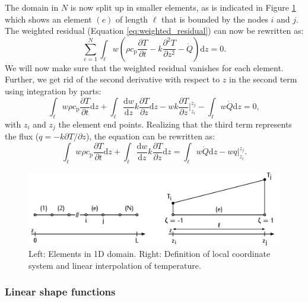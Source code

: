 \documentclass[10pt, a4paper, twoside, headinclude,footinclude, BCOR5mm]{scrartcl}
\begin{document}
The domain in \(N\) is now split up in smaller elements, as is indicated in Figure \ref{fig:org64cda58} which shows an element \((e)\) of length \(\ell\) that is bounded by the nodes \(i\) and \(j\). The weighted residual (Equation \ref{eq:weighted_residual}) can now be rewritten as:
\begin{equation}
  \sum_{e=1}^N
  \int_\ell w\left(
    \rho c_\text{p}\frac{\partial T}{\partial t} -
    k\frac{\partial^2 T}{\partial z^2} -
    \dot{Q} \right) \text{d}z = 0.
    \label{eq:weighted_residual_sum}
\end{equation}
We will now make sure that the weighted residual vanishes for each element. Further, we get rid of the second derivative with respect to \(z\) in the second term using integration by parts:
\begin{equation*}
  \int_\ell w \rho c_\text{p}\frac{\partial T}{\partial t} \text{d}z +
  \int_\ell
  \frac{\text{d}w}{\text{d}z}k\frac{\partial T}{\partial z}\text{d}z -
  wk\frac{\partial T}{\partial z}\Biggr|_{z_i}^{z_j} -
  \int_\ell w \dot{Q} \text{d}z = 0,
\end{equation*}
with \(z_i\) and \(z_j\) the element end points. Realizing that the third term represents the flux (\(q = -k \partial T / \partial z\)), the equation can be rewritten as:
\begin{equation}
  \int_\ell w \rho c_\text{p}\frac{\partial T}{\partial t} \text{d}z +
  \int_\ell
  \frac{\text{d}w}{\text{d}z}k\frac{\partial T}{\partial z}\text{d}z
  = \int_\ell w \dot{Q} \text{d}z -
  w q \Biggr|_{z_i}^{z_j}.
  \label{eq:weighted_residual_el}
\end{equation}

\begin{figure}[!tb]
\centering
\includegraphics[width=12cm]{./fig/lin_elements_sf.png}
\caption{\label{fig:org64cda58}Left: Elements in 1D domain. Right: Definition of local coordinate system and linear interpolation of temperature.}
\end{figure}

\subsubsection{Linear shape functions}
\label{sec:orgb88bce0}
\end{document}
